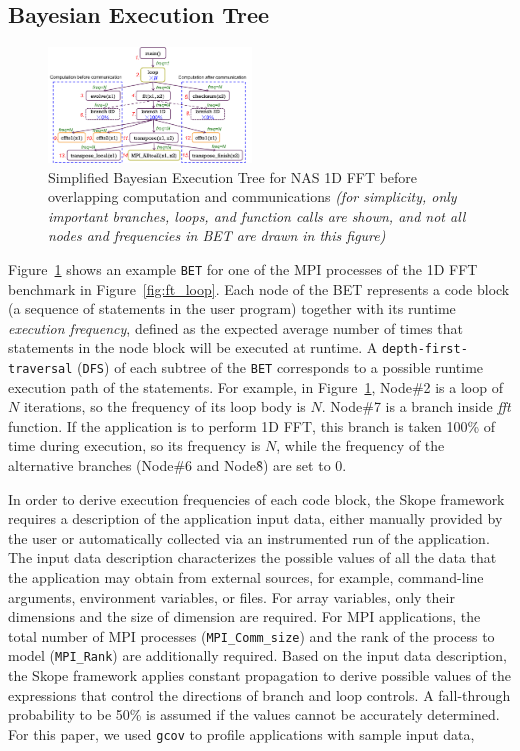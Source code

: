 \subsection {Bayesian Execution Tree}

\begin{figure}[h]
\begin{center}
\includegraphics[width=0.48\textwidth]{fig/ft_bet.png}
\caption{Simplified Bayesian Execution Tree for NAS 1D FFT before
  overlapping computation and communications \emph{(for simplicity,
    only important branches, loops, and function calls are shown, and
    not all nodes and frequencies in BET are drawn in this figure)}}
\label{fig:ft_bet}
\end{center}
\end{figure}

Figure~\ref{fig:ft_bet} shows an example \texttt{BET} for one of the
MPI processes of the 1D FFT benchmark in Figure~\ref{fig:ft_loop}.
Each node of the BET represents a code block (a sequence of statements
in the user program) together with its runtime \emph{execution
  frequency}, defined as the expected average number of times that
statements in the node block will be executed at runtime.  A
\texttt{depth-first-traversal} (\texttt{DFS}) of each subtree of the
\texttt{BET} corresponds to a possible runtime execution path of the
statements.  For example, in Figure~\ref{fig:ft_bet}, Node\#2 is a
loop of $N$ iterations, so the frequency of its loop body is $N$.
Node\#7 is a branch inside {\em fft} function. If the application is
to perform 1D FFT, this branch is taken 100\% of time during
execution, so its frequency is $N$, while the frequency of the
alternative branches (Node\#6 and Node\^8) are set to 0.

In order to derive execution frequencies of each code block, the Skope
framework requires a description of the application input data, either
manually provided by the user or automatically collected via an
instrumented run of the application.  The input data description
characterizes the possible values of all the data that the application
may obtain from external sources, for example, command-line arguments,
environment variables, or files.  For array variables, only their
dimensions and the size of dimension are required.  For MPI
applications, the total number of MPI processes
(\texttt{MPI\_Comm\_size}) and the rank of the process to model
(\texttt{MPI\_Rank}) are additionally required.  Based on the input
data description, the Skope framework applies constant propagation to
derive possible values of the expressions that control the directions
of branch and loop controls. A fall-through probability to be 50\% is
assumed if the values cannot be accurately determined.  For this
paper, we used \texttt{gcov} to profile applications with sample input
data,


